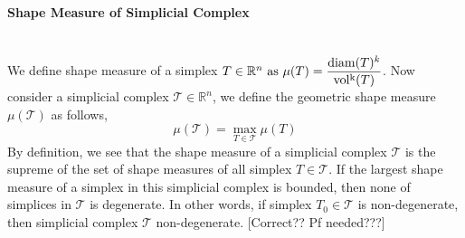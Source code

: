     \paragraph{Shape Measure of Simplicial Complex}\mbox{}\\
    We define shape measure of a simplex \(T \in\mathbb{R}^n$ as $\mu({{T}}) = \displaystyle \frac{\operatorname{diam}({T})^k}{\operatorname{vol^k}({T})}\). Now consider a simplicial complex $\mathcal{T}\in\mathbb{R}^n$, we define the geometric shape measure $\mu(\mathcal{T})$ as follows,
    \begin{equation*}
    \mu(\mathcal{T}) = \max_{T \in \mathcal{T}} \mu(T)
    \end{equation*}
    By definition, we see that the shape measure of a simplicial complex $\mathcal{T}$ is the supreme of the set of shape measures of all simplex $T\in\mathcal{T}$. If the largest shape measure of a simplex in this simplicial complex is bounded, then none of simplices in $\mathcal{T}$ is degenerate. In other words, if simplex $T_0 \in\mathcal{T}$ is non-degenerate, then simplicial complex $\mathcal{T}$ non-degenerate.
    [Correct?? Pf needed???]